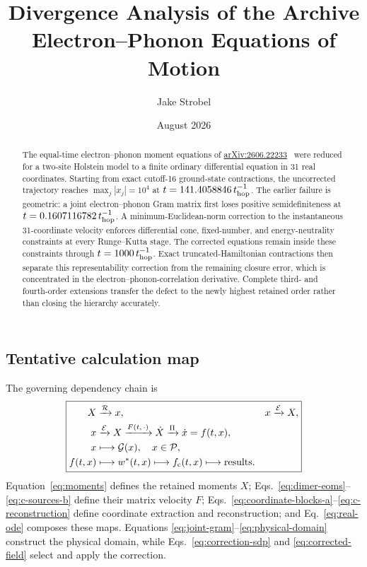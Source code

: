 \documentclass[10pt,twocolumn]{article}
\title{Divergence Analysis of the Archive Electron--Phonon Equations of Motion}
\author{Jake Strobel}
\date{August 2026}
\begin{document}
\maketitle

\begin{abstract}
The equal-time electron--phonon moment equations of
\href{https://arxiv.org/abs/2606.22233}{arXiv:2606.22233}~\cite{riva2026} were reduced for a
two-site Holstein model to a finite ordinary differential equation in 31 real
coordinates.  Starting from exact cutoff-16 ground-state contractions, the
uncorrected trajectory reaches $\max_j|x_j|=10^4$ at
$t=141.4058846\,t_{\rm hop}^{-1}$.  The earlier failure is geometric: a joint
electron--phonon Gram matrix first loses positive semidefiniteness at
$t=0.1607116782\,t_{\rm hop}^{-1}$.  A minimum-Euclidean-norm correction to
the instantaneous 31-coordinate velocity enforces differential cone,
fixed-number, and energy-neutrality constraints at every Runge--Kutta stage.
The corrected equations remain inside these constraints through
$t=1000\,t_{\rm hop}^{-1}$.  Exact truncated-Hamiltonian contractions then
separate this representability correction from the remaining closure error,
which is concentrated in the electron--phonon-correlation derivative.
Complete third- and fourth-order extensions transfer the defect to the newly
highest retained order rather than closing the hierarchy accurately.
\end{abstract}

\subsection*{Tentative calculation map}

The governing dependency chain is
\[
\boxed{
\begin{aligned}
X&\xrightarrow{\mathcal R}x,
&x&\xrightarrow{\mathcal E}X,\\
x&\xrightarrow{\mathcal E}X
\xrightarrow{F(t,\,\cdot)}\dot X
\xrightarrow{\Pi}\dot x=f(t,x),\\
x&\longmapsto\mathcal G(x),\quad x\in\mathcal P,\\
f(t,x)&\longmapsto w^*(t,x)
\longmapsto f_{\rm c}(t,x)
\longmapsto\text{results}.
\end{aligned}}
\]
Equation~\eqref{eq:moments} defines the retained moments $X$;
Eqs.~\eqref{eq:dimer-eoms}--\eqref{eq:c-sources-b} define their matrix
velocity $F$; Eqs.~\eqref{eq:coordinate-blocks-a}--\eqref{eq:c-reconstruction}
define coordinate extraction and reconstruction; and
Eq.~\eqref{eq:real-ode} composes these maps.  Equations
\eqref{eq:joint-gram}--\eqref{eq:physical-domain} construct the physical
domain, while Eqs.~\eqref{eq:correction-sdp} and
\eqref{eq:corrected-field} select and apply the correction.
\end{document}
